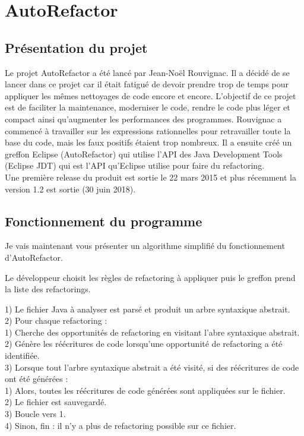 \documentclass[a4paper,twoside,12pt,openright]{report}
\begin{document}
\section{AutoRefactor}
\subsection{Présentation du projet}
Le projet AutoRefactor a été lancé par Jean-Noël Rouvignac. Il a décidé de se lancer dans ce projet car il était fatigué de devoir prendre trop de temps pour appliquer les mêmes nettoyages de code encore et encore. L'objectif de ce projet est de faciliter la maintenance, moderniser le code, rendre le code plus léger et compact ainsi qu'augmenter les performances des programmes. Rouvignac a commencé à travailler sur les expressions rationnelles pour retravailler toute la base du code, mais les faux positifs étaient trop nombreux.\cite{ref7} Il a ensuite créé un greffon Eclipse (AutoRefactor) qui utilise  l'API des Java Development Tools (Eclipse JDT) qui est l'API qu'Eclipse utilise pour faire du refactoring.\\
Une première release du produit est sortie le 22 mars 2015 et plus récemment la version 1.2 est sortie (30 juin 2018).\\

\subsection{Fonctionnement du programme}
Je vais maintenant vous présenter un algorithme simplifié du fonctionnement d'AutoRefactor.

Le développeur choisit les règles de refactoring à appliquer puis le greffon prend la liste des refactorings.

1) Le fichier Java à analyser est parsé et produit un arbre syntaxique abstrait.\\

2) Pour chaque refactoring :\\
\tabto{0.8cm} 1) Cherche des opportunités de refactoring en visitant l'abre syntaxique abstrait.\\
\tabto{0.8cm} 2) Génère les réécritures de code lorsqu'une  opportunité de refactoring a été identifiée.\\

3) Lorsque tout l'arbre syntaxique abstrait a été visité, si des réécritures de code ont été générées :\\
\tabto{0.8cm} 1) Alors, toutes les réécritures de code générées sont appliquées sur le fichier.\\
\tabto{0.8cm} 2) Le fichier est sauvegardé.\\
\tabto{0.8cm} 3) Boucle vers 1.\\
\tabto{0.8cm} 4) Sinon, fin : il n'y a plus de refactoring possible sur ce fichier.\\
\end{document}
